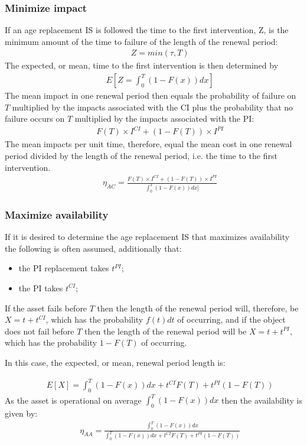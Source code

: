 \subsubsection{Minimize impact}
If an age replacement IS is followed the time to the first intervention, Z, is the minimum amount of the time to failure of the length of the renewal period:
\begin{eqnarray}
&& Z=min(\tau,T)
\end{eqnarray}
The expected, or mean, time to the first intervention is then determined by
\begin{eqnarray}
&& E[Z=\int_{0}^{T}(1-F(x))dx]
\end{eqnarray}
The mean impact in one renewal period then equals the probability of failure on $T$ multiplied by the impacts associated with the CI plus the probability that no failure occurs on $T$ multiplied by the impacts associated with the PI:
\begin{eqnarray}
&& F(T)\times I^{CI}+(1-F(T))\times I^{PI}
\end{eqnarray}
The mean impacts per unit time, therefore, equal the mean cost in one renewal period divided by the length of the renewal period, i.e. the time to the first intervention.
\begin{eqnarray}
&& \eta_{AC}=\frac{F(T)\times I^{CI}+(1-F(T))\times I^{PI}}{\int_{0}^{T}(1-F(x))dx]}
\end{eqnarray}
\subsubsection{Maximize availability}
If it is desired to determine the age replacement IS that maximizes availability the following is often assumed, additionally that:
\begin{itemize}
\item the PI replacement takes $t^{PI}$;
\item the PI takes $t^{CI}$;
\end{itemize}
If the asset fails before $T$ then the length of the renewal period will, therefore, be $X=t+t^{CI}$, which has the probability $f(t)dt$ of occurring, and if the object does not fail before $T$ then the length of the renewal period will be $X=t+t^{PI}$, which has the probability $1-F(T)$ of occurring.

In this case, the expected, or mean, renewal period length is:

\begin{eqnarray}
&& E[X] = \int_{0}^{T}(1-F(x))dx + t^{CI}F(T)+t^{PI}(1-F(T))
\end{eqnarray}
As the asset is operational on average $\int_{0}^{T}(1-F(x))dx$ then the availability is given by:
\begin{eqnarray}
&& \eta_{AA} = \frac{\int_{0}^{T}(1-F(x))dx}{\int_{0}^{T}(1-F(x))dx + t^{CI}F(T)+t^{PI}(1-F(T))}
\end{eqnarray}

